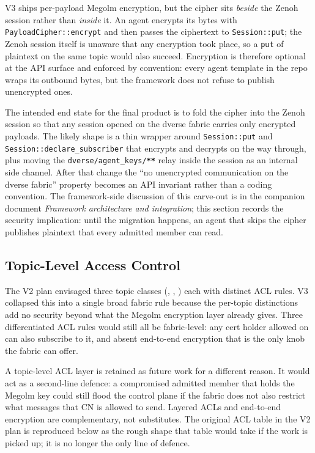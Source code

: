 \documentclass[11pt,a4paper]{article}
\begin{document}
V3 ships per-payload Megolm encryption, but the cipher sits
\emph{beside} the Zenoh session rather than \emph{inside} it. An
agent encrypts its bytes with \texttt{PayloadCipher::encrypt} and
then passes the ciphertext to \texttt{Session::put}; the Zenoh
session itself is unaware that any encryption took place, so a
\texttt{put} of plaintext on the same topic would also succeed.
Encryption is therefore optional at the API surface and enforced by
convention: every agent template in the repo wraps its outbound
bytes, but the framework does not refuse to publish unencrypted
ones.

The intended end state for the final product is to fold the cipher
into the Zenoh session so that any session opened on the dverse
fabric carries only encrypted payloads. The likely shape is a thin
wrapper around \texttt{Session::put} and
\texttt{Session::declare\_subscriber} that encrypts and decrypts on
the way through, plus moving the
\texttt{dverse/agent\_keys/\textbf{**}} relay inside the session as
an internal side channel. After that change the
``no unencrypted communication on the dverse fabric'' property
becomes an API invariant rather than a coding convention. The
framework-side discussion of this carve-out is in the companion
document \emph{Framework architecture and integration}; this
section records the security implication: until the migration
happens, an agent that skips the cipher publishes plaintext that
every admitted member can read.

\subsection{Topic-Level Access Control}

The V2 plan envisaged three topic classes
(, ,
) each with distinct ACL rules. V3
collapsed this into a single broad fabric rule because the per-topic
distinctions add no security beyond what the Megolm encryption layer
already gives. Three differentiated ACL rules would still all be
fabric-level: any cert holder allowed on
 can also subscribe to it, and absent
end-to-end encryption that is the only knob the fabric can offer.

A topic-level ACL layer is retained as future work for a different
reason. It would act as a second-line defence: a compromised
admitted member that holds the Megolm key could still flood the
control plane if the fabric does not also restrict what messages
that CN is allowed to send. Layered ACLs and end-to-end encryption
are complementary, not substitutes. The original ACL table in the V2
plan is reproduced below as the rough shape that table would take if
the work is picked up; it is no longer the only line of defence.
\end{document}
